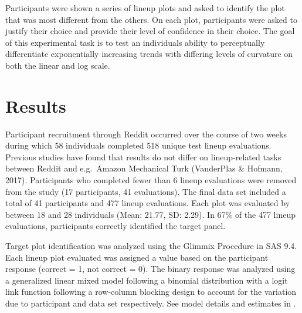 \documentclass[print]{nuthesis}
\begin{document}
Participants were shown a series of lineup plots and asked to identify the plot that was most different from the others.
On each plot, participants were asked to justify their choice and provide their level of confidence in their choice.
The goal of this experimental task is to test an individuals ability to perceptually differentiate exponentially increasing trends with differing levels of curvature on both the linear and log scale.

\hypertarget{results}{%
\section{Results}\label{results}}

Participant recruitment through Reddit occurred over the course of two weeks during which 58 individuals completed 518 unique test lineup evaluations. Previous studies have found that results do not differ on lineup-related tasks between Reddit and e.g.~Amazon Mechanical Turk (VanderPlas \& Hofmann, 2017).
Participants who completed fewer than 6 lineup evaluations were removed from the study (17 participants, 41 evaluations).
The final data set included a total of 41 participants and 477 lineup evaluations.
Each plot was evaluated by between 18 and 28 individuals (Mean: 21.77, SD: 2.29).
In 67\% of the 477 lineup evaluations, participants correctly identified the target panel.

Target plot identification was analyzed using the Glimmix Procedure in SAS 9.4.
Each lineup plot evaluated was assigned a value based on the participant response (correct = 1, not correct = 0).
The binary response was analyzed using a generalized linear mixed model following a binomial distribution with a logit link function following a row-column blocking design to account for the variation due to participant and data set respectively. See model details and estimates in .
\end{document}
